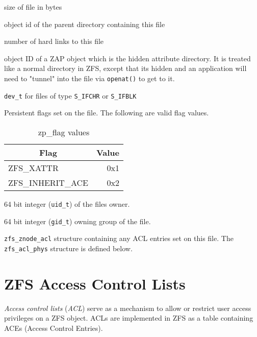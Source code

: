 \begin{description}[style=standard]
\item[zp\_size:]
  size of file in bytes

\item[zp\_parent:]
  object id of the parent directory containing this file

\item[zp\_links:]
  number of hard links to this file

\item[zp\_xattr:]
  object ID of a ZAP object which is the hidden attribute directory.
  It is treated like a normal directory in ZFS,
  except that its hidden and an application will need to "tunnel"
  into the file via \lstinline{openat()} to get to it.

\item[zp\_rdev:]
  \lstinline{dev_t} for files of type \lstinline{S_IFCHR} or \lstinline{S_IFBLK}

\item[zp\_flags:]
  Persistent flags set on the file.
  The following are valid flag values.
  \begin{table}[ht!]
    \centering
    \caption{zp\_flag values}\label{tbl:zp_flags}
    \begin{tabular}{lr}
      \toprule
      \multicolumn{1}{c}{\textbf{Flag}} & \multicolumn{1}{c}{\textbf{Value}} \\
      \midrule
      ZFS\_XATTR & 0x1\\
      ZFS\_INHERIT\_ACE & 0x2\\
      \bottomrule
    \end{tabular}
  \end{table}

\item[zp\_uid:] 64 bit integer (\lstinline{uid_t}) of the files owner.
\item[zp\_gid:] 64 bit integer (\lstinline{gid_t}) owning group of the file.
\item[zp\_acl:] \lstinline{zfs_znode_acl} structure containing any ACL entries set on this file.
  The \lstinline{zfs_acl_phys} structure is defined below.
\end{description}

\section{ZFS Access Control Lists}

\emph{Access control lists} (\emph{ACL}) serve as a mechanism
to allow or restrict user access privileges on a ZFS object.
ACLs are implemented in ZFS as a table containing ACEs (Access Control Entries).


